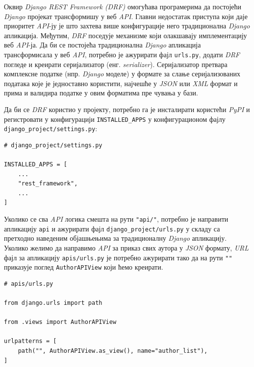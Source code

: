 \documentclass[12pt,oneside]{memoir}
\begin{document}
Оквир \textit{Django REST Framework (DRF)} омогућава програмерима да постојећи \textit{Django} пројекат трансформишу у веб \textit{API}. Главни недостатак приступа који даје приоритет \textit{API}-ју је што захтева више конфигурације него традиционална \textit{Django} апликација. Међутим, \textit{DRF} поседује механизме који олакшавају имплементацију веб \textit{API}-ја. Да би се постојећа традиционална \textit{Django} апликација трансформисала у веб \textit{API}, потребно је ажурирати фајл \texttt{urls.py}, додати \textit{DRF} погледе и креирати серијализатор (енг. \textit{serializer}). Серијализатор претвара комплексне податке (нпр. \textit{Django} моделе) у формате за слање серијализованих података које је једноставно користити, најчешће у \textit{JSON} или \textit{XML} формат и прима и валидира податке у овим форматима пре чувања у бази.

Да би се \textit{DRF} користио у пројекту, потребно га је инсталирати користећи \textit{PyPI} и регистровати у конфигурацији \texttt{INSTALLED\_APPS} у конфигурационом фајлу \texttt{django\_project/settings.py}:

\begin{lstlisting}
# django_project/settings.py

INSTALLED_APPS = [
    ...
    "rest_framework",
    ...
]
\end{lstlisting}


Уколико се сва \textit{API} логика смешта на рути \texttt{"api/"}, потребно је направити апликацију \texttt{api} и ажурирати фајл \texttt{django\_project/urls.py} у складу са претходно наведеним објашњењима за традиционалну \textit{Django} апликацију. Уколико желимо да направимо \textit{API} за приказ свих аутора у \textit{JSON} формату, \textit{URL} фајл за апликацију \texttt{apis/urls.py} је потребно ажурирати тако да на рути \texttt{""} приказује поглед 
\texttt{AuthorAPIView} који ћемо креирати.

\begin{lstlisting}
# apis/urls.py

from django.urls import path

from .views import AuthorAPIView

urlpatterns = [
    path("", AuthorAPIView.as_view(), name="author_list"),
]
\end{lstlisting}
\end{document}
